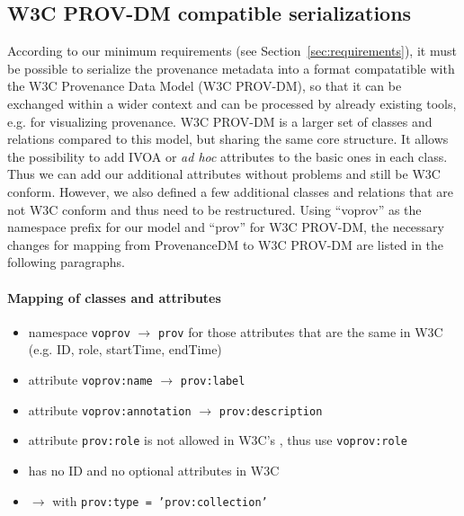 \subsection{W3C PROV-DM compatible serializations}\label{sec:w3cserialization}

According to our minimum requirements (see Section~\ref{sec:requirements}), it must be possible to
serialize the provenance metadata into a format compatatible with the W3C Provenance Data Model (W3C PROV-DM), so that it can be exchanged within a wider context and can be processed by already existing tools, e.g. for visualizing provenance.
W3C PROV-DM is a larger set of classes and relations compared to this model, but sharing the same core structure. It allows the possibility to add IVOA or \textit{ad hoc} attributes to the basic ones in each class. Thus we can add our additional attributes without problems and still be W3C conform. However, we also defined a few additional classes and relations that are not W3C conform and thus need to be restructured.
Using ``voprov'' as the namespace prefix for our model and ``prov'' for W3C PROV-DM, the necessary changes for mapping from ProvenanceDM to W3C PROV-DM are listed in the following paragraphs.

\paragraph{Mapping of classes and attributes}
\begin{itemize}
\item namespace \texttt{voprov} $\rightarrow$ \texttt{prov} for those attributes that are the same in W3C (e.g. ID, role, startTime, endTime)
\item attribute \texttt{voprov:name} $\rightarrow$ \texttt{prov:label}
\item attribute \texttt{voprov:annotation} $\rightarrow$ \texttt{prov:description}
\item attribute \texttt{prov:role} is not allowed in W3C's , thus use \texttt{voprov:role}
\item {} has no ID and no optional attributes in W3C
\item {} $\rightarrow$  with \texttt{prov:type = 'prov:collection'}
\end{itemize}

